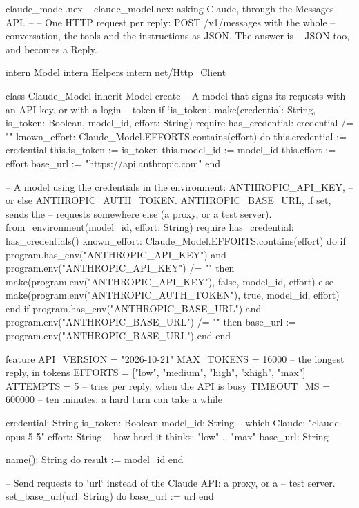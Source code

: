 \begin{newfile}{claude_model.nex}
-- claude_model.nex: asking Claude, through the Messages API.
--
-- One HTTP request per reply: POST /v1/messages with the whole
-- conversation, the tools and the instructions as JSON. The answer is
-- JSON too, and becomes a Reply.

intern Model
intern Helpers
intern net/Http_Client

class Claude_Model inherit Model
create
  -- A model that signs its requests with an API key, or with a login
  -- token if `is_token`.
  make(credential: String, is_token: Boolean, model_id, effort: String)
  require
    has_credential: credential /= ""
    known_effort: Claude_Model.EFFORTS.contains(effort)
  do
    this.credential := credential
    this.is_token := is_token
    this.model_id := model_id
    this.effort := effort
    base_url := "https://api.anthropic.com"
  end

  -- A model using the credentials in the environment: ANTHROPIC_API_KEY,
  -- or else ANTHROPIC_AUTH_TOKEN. ANTHROPIC_BASE_URL, if set, sends the
  -- requests somewhere else (a proxy, or a test server).
  from_environment(model_id, effort: String)
  require
    has_credential: has_credentials()
    known_effort: Claude_Model.EFFORTS.contains(effort)
  do
    if program.has_env("ANTHROPIC_API_KEY") and program.env("ANTHROPIC_API_KEY") /= "" then
      make(program.env("ANTHROPIC_API_KEY"), false, model_id, effort)
    else
      make(program.env("ANTHROPIC_AUTH_TOKEN"), true, model_id, effort)
    end
    if program.has_env("ANTHROPIC_BASE_URL") and program.env("ANTHROPIC_BASE_URL") /= "" then
      base_url := program.env("ANTHROPIC_BASE_URL")
    end
  end

feature
  API_VERSION = "2026-10-21"
  MAX_TOKENS = 16000       -- the longest reply, in tokens
  EFFORTS = ["low", "medium", "high", "xhigh", "max"]
  ATTEMPTS = 5             -- tries per reply, when the API is busy
  TIMEOUT_MS = 600000      -- ten minutes: a hard turn can take a while

  credential: String
  is_token: Boolean
  model_id: String     -- which Claude: "claude-opus-5-5"
  effort: String       -- how hard it thinks: "low" .. "max"
  base_url: String

  name(): String do
    result := model_id
  end

  -- Send requests to `url` instead of the Claude API: a proxy, or a
  -- test server.
  set_base_url(url: String) do
    base_url := url
  end
\end{newfile}

